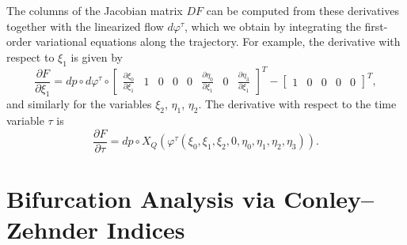 \documentclass[pdflatex,sn-mathphys-ay]{sn-jnl}%
\theoremstyle{thmstyleone}%
\theoremstyle{thmstyletwo}%
\theoremstyle{thmstylethree}%
\renewcommand{\phi}{\varphi}
\begin{document}
The columns of the Jacobian matrix $DF$ can be computed from these derivatives together with the linearized flow $d\phi^\tau$, which we obtain by integrating the first-order variational equations along the trajectory. For example, the derivative with respect to $\xi_1$ is given by
\[
\frac{\partial F}{\partial \xi_1} 
= dp \circ d\phi^{\tau} \circ
\begin{bmatrix}
    \frac{\partial \xi_0}{\partial \xi_1} &
    1 &
    0 &
    0 &
    0 &
    \frac{\partial \eta_0}{\partial \xi_1} &
    0 &
    \frac{\partial \eta_3}{\partial \xi_1}
\end{bmatrix}^T
- 
\begin{bmatrix}
    1 & 0 & 0 & 0 & 0
\end{bmatrix}^T,
\]
and similarly for the variables $\xi_2$, $\eta_1$, $\eta_2$.  
The derivative with respect to the time variable $\tau$ is
\[
    \frac{\partial F}{\partial \tau} 
    = dp \circ X_Q(\phi^{\tau}(\xi_0, \xi_1, \xi_2, 0, \eta_0, \eta_1, \eta_2, \eta_3)).
\]

\section{Bifurcation Analysis via Conley--Zehnder Indices}
\label{sec:appendix_cz}
\end{document}
